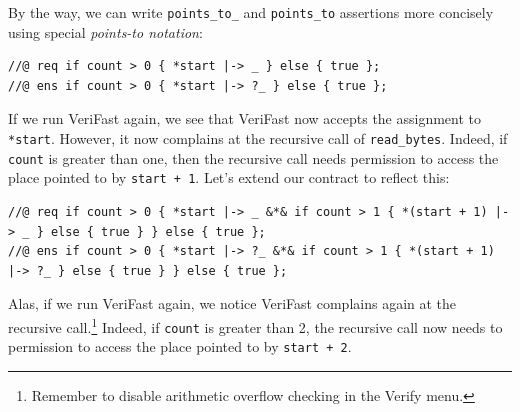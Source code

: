 \documentclass{article}
\begin{document}
By the way, we can write \lstinline|points_to_| and \lstinline|points_to| assertions more concisely using special \emph{points-to notation}:
\begin{lstlisting}
//@ req if count > 0 { *start |-> _ } else { true };
//@ ens if count > 0 { *start |-> ?_ } else { true };
\end{lstlisting}
If we run VeriFast again, we see that VeriFast now accepts the assignment to \lstinline!*start!. However, it now complains at the recursive call of
\lstinline!read_bytes!. Indeed, if \lstinline!count! is greater than one, then the recursive call needs permission to access the place pointed to by
\lstinline!start + 1!. Let's extend our contract to reflect this:
\begin{lstlisting}
//@ req if count > 0 { *start |-> _ &*& if count > 1 { *(start + 1) |-> _ } else { true } } else { true };
//@ ens if count > 0 { *start |-> ?_ &*& if count > 1 { *(start + 1) |-> ?_ } else { true } } else { true };
\end{lstlisting}
Alas, if we run VeriFast again, we notice VeriFast complains again at the recursive call.\footnote{Remember to disable arithmetic overflow checking in the Verify menu.}
Indeed, if \lstinline!count! is greater than 2,
the recursive call now needs to permission to access the place pointed to by \lstinline!start + 2!.
\end{document}
